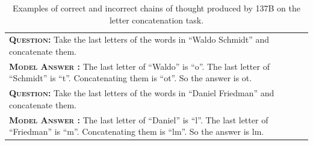 \begingroup
\begin{table}[h]
    \centering
    \small
    \caption{
    Examples of correct and incorrect chains of thought produced by \lamda{} 137B on the letter concatenation task.
    }
    \begin{tabular}{p{\linewidth}}
        \toprule
        \vspace{-2mm}
        \textbf{\textsc{Question:}} Take the last letters of the words in ``Waldo Schmidt'' and concatenate them. \\
        \vspace{-1mm}
        \textbf{\textsc{Model Answer \color{darkGreen}{(CORRECT)}:}} The last letter of ``Waldo'' is ``o''. The last letter of ``Schmidt'' is ``t''. Concatenating them is ``ot''. So the answer is ot. \color{darkGreen}{\checkmark} \\
        \midrule
        \vspace{-2mm}
        \textbf{\textsc{Question:}} Take the last letters of the words in ``Daniel Friedman'' and concatenate them. \\
        \vspace{-1mm}
        \textbf{\textsc{Model Answer \color{blue}{(INCORRECT)}:}} The last letter of ``Daniel'' is ``l''. The {\color{blue} last letter of ``Friedman'' is ``m''.} Concatenating them is ``lm''. So the answer is lm. \color{blue}{\xmark} \\
        \bottomrule
    \end{tabular}
    \label{tab:appendix-letter-concat-examples}
\end{table}
\endgroup